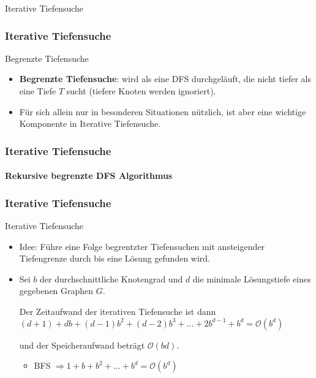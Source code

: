 \begin{frame}
		\Huge Iterative Tiefensuche
\end{frame}
	
\begin{frame}
	\frametitle{Iterative Tiefensuche}
	\begin{KITinfoblock}{Begrenzte Tiefensuche}
	\begin{itemize}
		\item \textbf{Begrenzte Tiefensuche}: wird als eine DFS durchgeläuft, die nicht tiefer als eine Tiefe $T$ sucht (tiefere Knoten werden ignoriert).
		\item Für sich allein nur in besonderen Situationen nützlich, ist aber eine wichtige Komponente in Iterative Tiefensuche.
	\end{itemize}
	\end{KITinfoblock}
\end{frame}

\begin{frame}
	\frametitle{Iterative Tiefensuche}
	\framesubtitle{Rekursive begrenzte DFS Algorithmus}
		
\end{frame}

\begin{frame}
	\frametitle{Iterative Tiefensuche}
	\begin{KITinfoblock}{Iterative Tiefensuche}
		\begin{itemize}
			\item Idee: Führe eine Folge begrentzter Tiefensuchen mit ansteigender Tiefengrenze durch bis eine Lösung gefunden wird.
			
			\item Sei $b$ der durchschnittliche Knotengrad und $d$ die minimale Lösungstiefe eines gegebenen Graphen $G$.
			  
			\vspace{0.05in}
			Der Zeitaufwand der iterativen Tiefensuche ist dann
			\linebreak[2]
			$(d+1) + db + (d-1)b^2 + (d-2)b^3 + ... + 2b^{d-1} + b^d = \mathcal{O}(b^d)$
			
			und der Speicheraufwand beträgt $\mathcal{O}(bd)$.
			\begin{itemize}
				\item BFS $\Rightarrow 1 + b + b^2 + ... + b^d = \mathcal{O}(b^d)$
			\end{itemize}			
		\end{itemize}
	\end{KITinfoblock}
	\pause
	
	
\end{frame}

